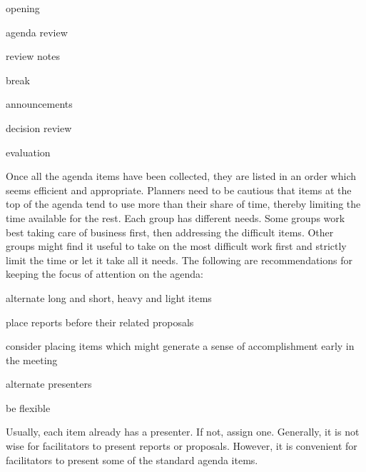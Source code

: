 \squishitemizetwo%

\item {}opening
\item {}agenda review
\item review notes
\item {}break
\item announcements
\item decision review
\item {}evaluation
\squishend%


\squishend%

Once all the agenda items have been collected, they are listed in
an order which seems efficient and appropriate. Planners need to be
cautious that items at the top of the agenda tend to use more than
their share of time, thereby limiting the time available for the
rest. Each group has different needs. Some groups work best taking
care of business first, then addressing the difficult items. Other
groups might find it useful to take on the most difficult work
first and strictly limit the time or let it take all it needs. The
following are recommendations for keeping the focus of attention on
the agenda:

\squishitemize%

\item alternate long and short, heavy and light items
\item place reports before their related proposals
\item consider placing items which might generate a sense of
  accomplishment early in the meeting
\item alternate presenters
\item be flexible
\squishend%

Usually, each item already has a presenter. If not, assign
one. Generally, it is not wise for facilitators to present reports
or proposals. However, it is convenient for facilitators to present
some of the standard agenda items.

